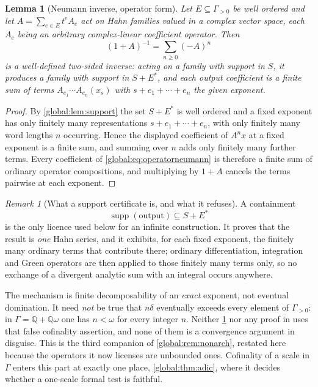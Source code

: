 \documentclass[11pt,letterpaper]{article}
\newtheorem{lemma}[lemma]{Lemma}
\theoremstyle{definition}
\theoremstyle{remark}
\newtheorem{remark}[remark]{Remark}
\newcommand{\Q}{\mathbb Q}
\newcommand{\supp}{\operatorname{supp}}
\numberwithin{equation}{section}
\begin{document}
\begin{lemma}[Neumann inverse, operator form]\label{global:lem:operatorneumann}
Let $E\subseteq\Gamma_{>0}$ be well ordered and let $A=\sum_{e\in E}t^eA_e$ act on Hahn families valued in a complex vector space, each $A_e$ being an arbitrary complex-linear coefficient operator. Then
\begin{equation}\label{global:eq:operatorneumann}
  (1+A)^{-1}=\sum_{n\ge0}(-A)^n
\end{equation}
is a well-defined two-sided inverse: acting on a family with support in $S$, it produces a family with support in $S+E^*$, and each output coefficient is a finite sum of terms $A_{e_1}\cdots A_{e_n}(x_s)$ with $s+e_1+\cdots+e_n$ the given exponent.
\end{lemma}

\begin{proof}
By \cref{global:lem:support} the set $S+E^*$ is well ordered and a fixed exponent has only finitely many representations $s+e_1+\cdots+e_n$, with only finitely many word lengths $n$ occurring. Hence the displayed coefficient of $A^nx$ at a fixed exponent is a finite sum, and summing over $n$ adds only finitely many further terms. Every coefficient of \eqref{global:eq:operatorneumann} is therefore a finite sum of ordinary operator compositions, and multiplying by $1+A$ cancels the terms pairwise at each exponent.
\end{proof}

\begin{remark}[What a support certificate is, and what it refuses]\label{global:rem:certificate}
A containment
\begin{equation}\label{global:eq:certificate}
  \supp(\text{output})\subseteq S+E^*
\end{equation}
is the only licence used below for an infinite construction. It proves that the result is \emph{one} Hahn series, and it exhibits, for each fixed exponent, the finitely many ordinary terms that contribute there; ordinary differentiation, integration and Green operators are then applied to those finitely many terms only, so no exchange of a divergent analytic sum with an integral occurs anywhere.

The mechanism is finite decomposability of an \emph{exact} exponent, not eventual domination. It need \emph{not} be true that $n\delta$ eventually exceeds every element of $\Gamma_{>0}$: in $\Gamma=\Q+\Q\omega$ one has $n<\omega$ for every integer $n$. Neither \cref{global:lem:operatorneumann} nor any proof in  uses that false cofinality assertion, and none of them is a convergence argument in disguise. This is the third companion of \cref{global:rem:nonarch}, restated here because the operators it now licenses are unbounded ones. Cofinality of a scale in $\Gamma$ enters this part at exactly one place, \cref{global:thm:adic}, where it decides whether a one-scale formal test is faithful.
\end{remark}
\end{document}
